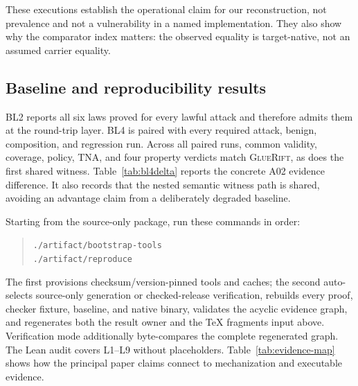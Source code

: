 \documentclass[sigconf,anonymous,review]{acmart}
\newcommand{\sys}{\textsc{GlueRift}\xspace}
\begin{document}
These executions establish the operational claim for our
reconstruction, not prevalence and not a vulnerability in a named
implementation.  They also show why the comparator index matters: the
observed equality is target-native, not an assumed carrier equality.

\subsection{Baseline and reproducibility results}

BL2 reports all six laws proved for every lawful attack and therefore
admits them at the round-trip layer.  BL4 is paired with every required
attack, benign, composition, and regression run.  Across all paired
runs, common validity, coverage, policy, TNA, and
four property verdicts match \sys, as does the first shared witness.
Table~\ref{tab:bl4delta} reports the concrete A02 evidence difference.  It
also records that the nested semantic witness path is shared, avoiding an
advantage claim from a deliberately degraded baseline.

\begin{table}[t]
\caption{Observed evidence on A02; BL4 is the Direct-Relation control.}
\label{tab:bl4delta}
\centering
\scriptsize
\setlength{\tabcolsep}{3pt}

\end{table}

Starting from the source-only package, run these commands in order:
\begin{quote}
\small\texttt{./artifact/bootstrap-tools}\\[-2pt]
\texttt{./artifact/reproduce}
\end{quote}
The first provisions checksum/version-pinned tools and caches; the second
auto-selects source-only generation or checked-release verification, rebuilds
every proof, checker fixture, baseline, and native binary, validates the
acyclic evidence graph, and regenerates both the result owner and the TeX
fragments input above.  Verification mode additionally byte-compares the
complete regenerated graph.  The Lean audit covers L1--L9 without placeholders.
Table~\ref{tab:evidence-map} shows how the principal paper claims connect to
mechanization and executable evidence.
\end{document}
